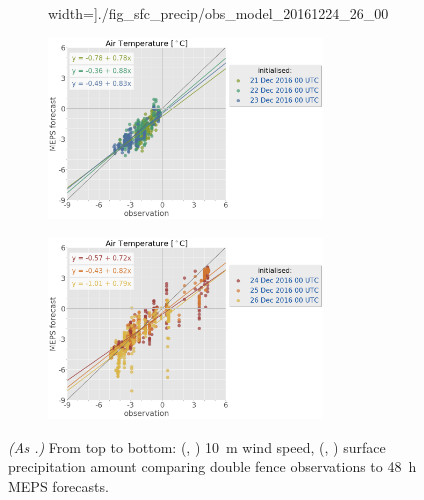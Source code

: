 \begin{figure}
\begin{subfigure}[b]{0.49\textwidth}
		width=\textwidth]{./fig_sfc_precip/obs_model_20161224_26_00}
		\caption{}\label{fig:scat:precip2426}
	\end{subfigure}
	\begin{subfigure}[b]{0.49\textwidth}
		\centering
		\includegraphics[trim={25.cm 15.5cm 0cm 3.6cm},clip,
		width=0.8\textwidth]{./fig_sfc_temp/obs_model_20161221_23_00_label}
	\end{subfigure}
	\begin{subfigure}[b]{0.49\textwidth}
		\centering
		\includegraphics[trim={25.cm 15.5cm 0cm 3.6cm},clip,
		width=0.8\textwidth]{./fig_sfc_temp/obs_model_20161224_26_00_label}
	\end{subfigure}
	\caption{\textit{(As .)} From top to bottom: (\protect{}, \protect{}) \SI{10}{\metre} wind speed, (\protect{}, \protect{}) surface precipitation amount comparing double fence observations to \SI{48}{\hour} MEPS forecasts.} \label{fig:scat:WS_precip}
\end{figure}
\noindent
\\
\\
